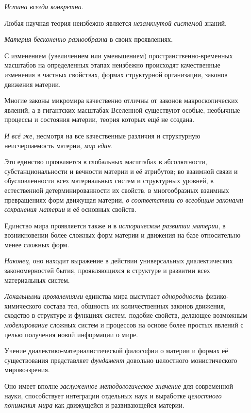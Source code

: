 \documentclass[a4paper,14pt,russian]{extreport}
\begin{document}
\emph{Истина всегда конкретна.}

Любая научная теория неизбежно является \emph{незамкнутой системой} знаний.

\emph{Материя бесконенно разнообразна} в своих проявлениях.

С изменением (увеличением или уменьшением) пространственно-временных масштабов на определенных этапах неизбежно происходят качественные изменения в частных свойствах, формах структурной организации, законов движения материи.

Многие законы микромира качественно отличны от законов макроскопических явлений, а в гигантских масштабах Вселенной существуют особые, необычные процессы и состояния материи, теория которых ещё не создана.

\emph{И всё же}, несмотря на все качественные различия и структурную неисчерпаемость материи, \emph{мир един}.

Это единство проявляется в глобальных масштабах в абсолютности, субстанциональности и вечности материи и её атрибутов; во взаимной связи и обусловленности всех материальных систем и структурных уровней, в естественной детерминированности их свойств, в многообразных взаимных превращениях форм движущая материи, \emph{в соответствии со всеобщим законами сохранения материи} и её основных свойств.

Единство мира проявляется также и в \emph{историческом развитии материи}, в возникновении более сложных форм материи и движения на базе относительно менее сложных форм.

\emph{Наконец}, оно находит выражение в действии универсальных диалектических закономерностей бытия, проявляющихся в структуре и развитии всех материальных систем.

\emph{Локальными проявлениями} единства мира выступает \emph{однородность} физико-химического состава тел, общность их количественных законов движения, сходство в структуре и функциях систем, подобие свойств, делающее возможным \emph{моделирование} сложных систем и процессов на основе более простых явлений с целью получения новой информации о мире.

Учение диалектико-материалистической философии о материи и формах её существования представляет \emph{фундамент} довольно целостного монистического мировоззрения.

Оно имеет вполне \emph{заслуженное методологическое значение} для современной науки, способствует интеграции отдельных наук и выработке \emph{целостного понимания мира} как движущейся и развивающейся материи.
\end{document}
